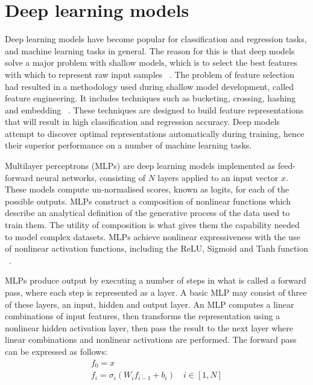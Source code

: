 
\section{Deep learning models}

Deep learning models have become popular for classification and regression tasks, and machine learning tasks in general. The reason for this is that deep models solve a major problem with shallow models, which is to select the best features with which to represent raw input samples \unskip ~\citep{Goodfellow-et-al-2016}. The problem of feature selection had resulted in a methodology used during shallow model development, called feature engineering. It includes techniques such as bucketing, crossing, hashing and embedding \unskip ~\citep{murphy2012machine, Goodfellow-et-al-2016}. These techniques are designed to build feature representations that will result in high classification and regression accuracy. Deep models attempt to discover optimal representations automatically during training, hence their superior performance on a number of machine learning tasks. \par

\noindent Multilayer perceptrons (MLPs) are deep learning models implemented as feed-forward neural networks, consisting of $N$ layers applied to an input vector $ x $. These models compute un-normalised scores, known as logits, for each of the possible outputs. MLPs construct a composition of nonlinear functions which describe an analytical definition of the generative process of the data used to train them. The utility of composition is what gives them the capability needed to model complex datasets. MLPs achieve nonlinear expressiveness with the use of nonlinear activation functions, including the ReLU, Sigmoid and Tanh function \unskip ~\citep{Goodfellow-et-al-2016}.  \par

\noindent MLPs produce output by executing a number of steps in what is called a forward pass, where each step is represented as a layer. A basic MLP may consist of three of these layers, an input, hidden and output layer. An MLP computes a linear combinations of input features, then transforms the representation using a nonlinear hidden activation layer, then pass the result to the next layer where linear combinations and nonlinear activations are performed. The forward pass can be expressed as follows:
\begin{subequations}
	\begin{gather}
		f_0 = x \\
		f_i=\sigma_i(W_if_{i - 1} + b_i) \quad i \in [1, N]
	\end{gather}
\end{subequations}

